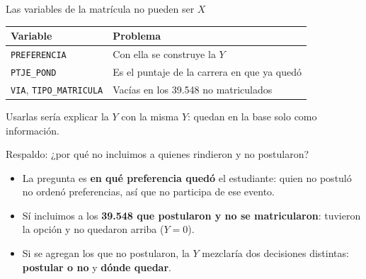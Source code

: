 \begin{frame}{Las variables de la matrícula no pueden ser $X$}
  \centering
  \begin{tabular}{ll}
    \toprule
    \textbf{Variable} & \textbf{Problema} \\
    \midrule
    \texttt{PREFERENCIA}                  & Con ella se construye la $Y$ \\
    \texttt{PTJE\_POND}                   & Es el puntaje de la carrera en que ya quedó \\
    \texttt{VIA}, \texttt{TIPO\_MATRICULA} & Vacías en los 39.548 no matriculados \\
    \bottomrule
  \end{tabular}

  \medskip
  Usarlas sería explicar la $Y$ con la misma $Y$: quedan en la base solo
  como información.
\end{frame}

\begin{frame}{Respaldo: ¿por qué no incluimos a quienes rindieron y no postularon?}
  \begin{itemize}
    \item La pregunta es \textbf{en qué preferencia quedó} el estudiante:
          quien no postuló no ordenó preferencias, así que no participa de
          ese evento.
    \item Sí incluimos a los \textbf{39.548 que postularon y no se
          matricularon}: tuvieron la opción y no quedaron arriba ($Y = 0$).
    \item Si se agregan los que no postularon, la $Y$ mezclaría dos
          decisiones distintas: \textbf{postular o no} y \textbf{dónde quedar}.
  \end{itemize}
\end{frame}


